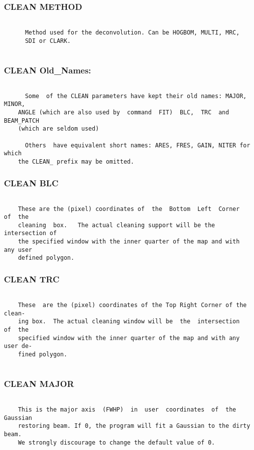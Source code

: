 \subsubsection{CLEAN METHOD}
\begin{verbatim}

      Method used for the deconvolution. Can be HOGBOM, MULTI, MRC,
      SDI or CLARK.


\end{verbatim}
\subsubsection{CLEAN Old\_Names:}
\begin{verbatim}

      Some  of the CLEAN parameters have kept their old names: MAJOR, MINOR,
    ANGLE (which are also used by  command  FIT)  BLC,  TRC  and  BEAM_PATCH
    (which are seldom used)

      Others  have equivalent short names: ARES, FRES, GAIN, NITER for which
    the CLEAN_ prefix may be omitted.

\end{verbatim}
\subsubsection{CLEAN BLC}
\begin{verbatim}

    These are the (pixel) coordinates of  the  Bottom  Left  Corner  of  the
    cleaning  box.   The actual cleaning support will be the intersection of
    the specified window with the inner quarter of the map and with any user
    defined polygon.

\end{verbatim}
\subsubsection{CLEAN TRC}
\begin{verbatim}

    These  are the (pixel) coordinates of the Top Right Corner of the clean-
    ing box.  The actual cleaning window will be  the  intersection  of  the
    specified window with the inner quarter of the map and with any user de-
    fined polygon.


\end{verbatim}
\subsubsection{CLEAN MAJOR}
\begin{verbatim}

    This is the major axis  (FWHP)  in  user  coordinates  of  the  Gaussian
    restoring beam. If 0, the program will fit a Gaussian to the dirty beam.
    We strongly discourage to change the default value of 0.

\end{verbatim}
